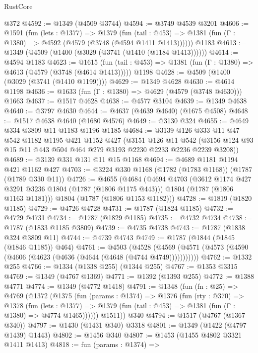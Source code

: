 \begin{lexlean}{RustCore}
\begin{coremodule}
    @372
@4592 := @1349 (@4509 @3744)
@4594 := @3749 @4539 @3201
@4606 := @1591
    (fun (lets : @1377) =>
    @1379
      (fun (tail : @453) => @1381 (fun (Γ : @1380) => @4592 (@4579 (@3748 (@4594 @1411 @1413))))))
    @1183
@4613 := @1349 (@4509 (@1400 (@3029 (@3741 (@1410 (@1184 @1413))))))
@4614 := @4594 @1183
@4623 := @1615
    (fun (tail : @453) => @1381 (fun (Γ : @1380) => @4613 (@4579 (@3748 (@4614 @1413)))))
    @1198
@4628 := @4509 (@1400 (@3029 (@3741 (@1410 @1199))))
@4629 := @1349 @4628
@4630 := @4614 @1198
@4636 := @1633 (fun (Γ : @1380) => @4629 (@4579 (@3748 @4630))) @1663
@4637 := @1517 @4628
@4638 := @4577 @3104
@4639 := @1349 @4638
@4640 := @3797 @4630
@4644 := @4637 (@4639 @4640) (@1675 @4508)
@4648 := @1517 @4638 @4640 (@1680 @4576)
@4649 := @3130 @324
@4655 := @4649 @334 @3809 @11 @1183 @1196 @1185
@4684 := @3139
    @126
    @333
    @11
    @47
    @542
    @1182
    @1195
    @421
    @1152
    @427
    (@3151
      @126
      @11
      @542
      (@3156 @124 @93 @15 @11 @443 @504 @464 @279 @3193 @2230 @2233 @2236 @2239 @3208))
@4689 := @3139 @331 @131 @11 @15 @1168
@4694 := @4689 @1181 @1194 @421 @1162 @427
@4703 := @3224 @330 @1168 (@1782 (@1783 @1168)) (@1787 (@1789 @330 @11))
@4726 := @4655
    (@4684
      (@4694
        @4703
        (@3612 @1174 @427 @3291 @3236 @1804 (@1787 (@1806 @1175 @443)))
        @1804
        (@1787 (@1806 @1163 @1181)))
      @1804
      (@1787 (@1806 @1153 @1182)))
@4728 := @1819 (@1820 @1185)
@4729 := @4726 @4728
@4731 := @1787 (@1824 @1185)
@4732 := @4729 @4731
@4734 := @1787 (@1829 @1185)
@4735 := @4732 @4734
@4738 := @1787 (@1833 @1185 @3809)
@4739 := @4735 @4738
@4743 := @1787 (@1838 @324 @3809 @11)
@4744 := @4739 @4743
@4749 := @1787 (@1844 (@1845 (@1846 @1185)) @464)
@4761 := @4503
    (@4528 (@4569 (@4571 (@4573 (@4590 (@4606 (@4623 (@4636 (@4644 (@4648 (@4744 @4749)))))))))))
@4762 := @1332 @255
@4766 := @1334 (@1338 @255) (@1344 @255)
@4767 := @1353 @3315
@4769 := @1349 (@4767 @1369)
@4771 := @1392 (@1393 @255)
@4772 := @1388 @4771
@4774 := @1349 (@4772 @1418)
@4791 := @1348
    (fun (fn : @25) =>
    @4769
      (@1372
        (@1375
          (fun (params : @1374) =>
          @1376
            (fun (rty : @370) =>
            @1378
              (fun (lets : @1377) =>
              @1379 (fun (tail : @453) => @1381 (fun (Γ : @1380) => @4774 @1465))))))
        @1511))
    @340
@4794 := @1517 (@4767 (@1367 @340))
@4797 := @1430 (@1431 @340) @3318
@4801 := @1349 (@1422 (@4797 @1439) @1443)
@4802 := @1456 @340
@4807 := @1453 (@1455 @4802 @3321 @1411 @1413)
@4818 := fun (params : @1374) =>

\end{coremodule}
\end{lexlean}
